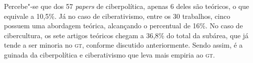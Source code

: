 Percebe"-se que dos 57 \emph{papers} de ciberpolítica, apenas
6 deles são teóricos, o que equivale a 10,5\%. Já no caso de
ciberativismo, entre os 30 trabalhos, cinco possuem uma abordagem
teórica, alcançando o percentual de 16\%. No caso de cibercultura, os
sete artigos teóricos chegam a 36,8\% do total da subárea, que já tende
a ser minoria no \textsc{gt}, conforme discutido anteriormente. Sendo assim, é a
guinada da ciberpolítica e ciberativismo que leva mais empiria ao \textsc{gt}.

